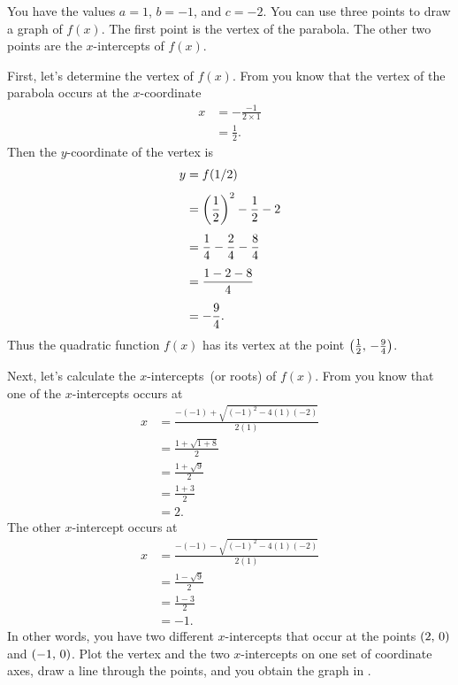 \documentclass[a4paper,oneside,12pt]{article}
\begin{document}
\begin{solution}
You have the values $a = 1$, $b = -1$, and $c = -2$.  You can use
three points to draw a graph of $f(x)$.  The first point is the
vertex of the parabola.  The other two points are the $x$-intercepts
of $f(x)$.

First, let's determine the vertex of $f(x)$.  From
 you know that the vertex of
the parabola occurs at the $x$-coordinate
\begin{align*}
x
&=
-\frac{-1}{2 \times 1} \\[4pt]
&=
\frac{1}{2}.
\end{align*}
Then the $y$-coordinate of the vertex is
\begin{align*}
y
&=
f(1/2) \\[4pt]
&=
\parenthesis*{\frac{1}{2}}^2 - \frac{1}{2} - 2 \\[4pt]
&=
\frac{1}{4} - \frac{2}{4} - \frac{8}{4} \\[4pt]
&=
\frac{1 - 2 - 8}{4} \\[4pt]
&=
-\frac{9}{4}.
\end{align*}
Thus the quadratic function $f(x)$ has its vertex at the point
$\tuple{\frac{1}{2}}{-\frac{9}{4}}$.

Next, let's calculate the $x$-intercepts~(or roots) of $f(x)$.  From
 you know that one of the
$x$-intercepts occurs at
\begin{align*}
x
&=
\frac{
  -(-1) + \sqrt{(-1)^2 - 4(1)(-2)}
}{
  2(1)
} \\[4pt]
&=
\frac{
  1 + \sqrt{1 + 8}
}{
  2
} \\[4pt]
&=
\frac{
  1 + \sqrt{9}
}{
  2
} \\[4pt]
&=
\frac{
  1 + 3
}{
  2
} \\[4pt]
&=
2.
\end{align*}
The other $x$-intercept occurs at
\begin{align*}
x
&=
\frac{
  -(-1) - \sqrt{(-1)^2 - 4(1)(-2)}
}{
  2(1)
} \\[4pt]
&=
\frac{
  1 - \sqrt{9}
}{
  2
} \\[4pt]
&=
\frac{
  1 - 3
}{
  2
} \\[4pt]
&=
-1.
\end{align*}
In other words, you have two different $x$-intercepts that occur at
the points $\tuple{2}{0}$ and $\tuple{-1}{0}$.  Plot the vertex and
the two $x$-intercepts on one set of coordinate axes, draw a line
through the points, and you obtain the graph in
.
\end{solution}
\end{document}
